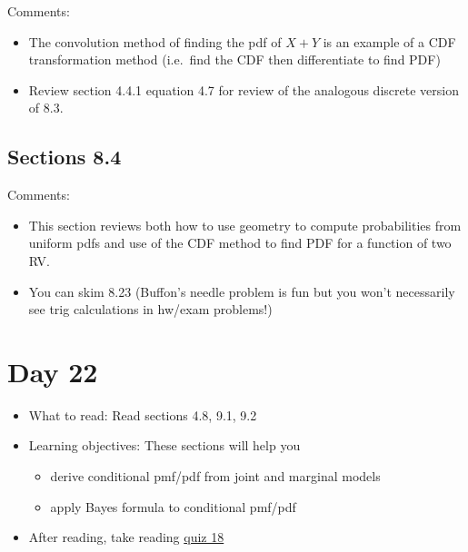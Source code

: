\documentclass[
  letterpaper,
]{scrbook}
\providecommand{\tightlist}{%
  \setlength{\itemsep}{0pt}\setlength{\parskip}{0pt}}\usepackage{longtable,booktabs,array}
\begin{document}
Comments:

\begin{itemize}
\tightlist
\item
  The convolution method of finding the pdf of \(X+Y\) is an example of
  a CDF transformation method (i.e.~find the CDF then differentiate to
  find PDF)
\item
  Review section 4.4.1 equation 4.7 for review of the analogous discrete
  version of 8.3.
\end{itemize}

\subsection*{Sections 8.4}\label{sections-8.4}

Comments:

\begin{itemize}
\tightlist
\item
  This section reviews both how to use geometry to compute probabilities
  from uniform pdfs and use of the CDF method to find PDF for a function
  of two RV.
\item
  You can skim 8.23 (Buffon's needle problem is fun but you won't
  necessarily see trig calculations in hw/exam problems!)
\end{itemize}

\section*{Day 22}\label{day-22}


\begin{itemize}
\item
  What to read: Read sections 4.8, 9.1, 9.2
\item
  Learning objectives: These sections will help you

  \begin{itemize}
  \tightlist
  \item
    derive conditional pmf/pdf from joint and marginal models
  \item
    apply Bayes formula to conditional pmf/pdf
  \end{itemize}
\item
  After reading, take reading
  \href{https://forms.gle/aoCcCr7x9s8o6Uhk8}{quiz 18}
\end{itemize}
\end{document}

